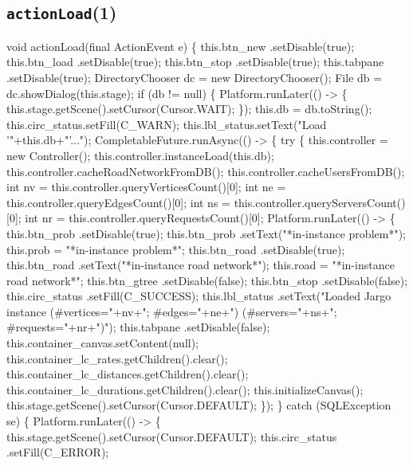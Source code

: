 \subsection{\texttt{actionLoad}(1)}
\nwenddocs{}\endmoddef{}
void actionLoad(final ActionEvent e) \{
  this.btn_new      .setDisable(true);
  this.btn_load     .setDisable(true);
  this.btn_stop     .setDisable(true);
  this.tabpane      .setDisable(true);
  DirectoryChooser dc = new DirectoryChooser();
  File db = dc.showDialog(this.stage);
  if (db != null) \{
    Platform.runLater(() -> \{
      this.stage.getScene().setCursor(Cursor.WAIT);
    \});
    this.db = db.toString();
    this.circ_status.setFill(C_WARN);
    this.lbl_status.setText("Load '"+this.db+"'...");
    CompletableFuture.runAsync(() -> \{
      try \{
        this.controller = new Controller();
        this.controller.instanceLoad(this.db);
        this.controller.cacheRoadNetworkFromDB();
        this.controller.cacheUsersFromDB();
        int nv = this.controller.queryVerticesCount()[0];
        int ne = this.controller.queryEdgesCount()[0];
        int ns = this.controller.queryServersCount()[0];
        int nr = this.controller.queryRequestsCount()[0];
        Platform.runLater(() -> \{
          this.btn_prob     .setDisable(true);
          this.btn_prob     .setText("*in-instance problem*");
          this.prob = "*in-instance problem*";
          this.btn_road     .setDisable(true);
          this.btn_road     .setText("*in-instance road network*");
          this.road = "*in-instance road network*";
          this.btn_gtree    .setDisable(false);
          this.btn_stop     .setDisable(false);
          this.circ_status  .setFill(C_SUCCESS);
          this.lbl_status   .setText("Loaded Jargo instance (#vertices="+nv+"; #edges="+ne+") (#servers="+ns+"; #requests="+nr+")");
          this.tabpane      .setDisable(false);
          this.container_canvas.setContent(null);
          this.container_lc_rates.getChildren().clear();
          this.container_lc_distances.getChildren().clear();
          this.container_lc_durations.getChildren().clear();
          this.initializeCanvas();
          this.stage.getScene().setCursor(Cursor.DEFAULT);
        \});
      \} catch (SQLException se) \{
        Platform.runLater(() -> \{
          this.stage.getScene().setCursor(Cursor.DEFAULT);
          this.circ_status  .setFill(C_ERROR);

